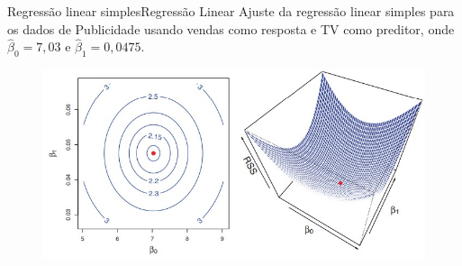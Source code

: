 \documentclass[t]{beamer}
\begin{document}

\begin{ftst}{Regressão linear simples}{Regressão Linear}
Ajuste da regressão linear simples para os dados de Publicidade usando vendas como resposta e TV como preditor, onde $\hat{\beta}_0 = 7,03$ e $\hat{\beta}_1 = 0,0475$.
\vone
\begin{figure}
    \centering
    \includegraphics[scale=0.5]{Figuras/slide05_03.jpg}
\end{figure}


\end{ftst}

\end{document}
